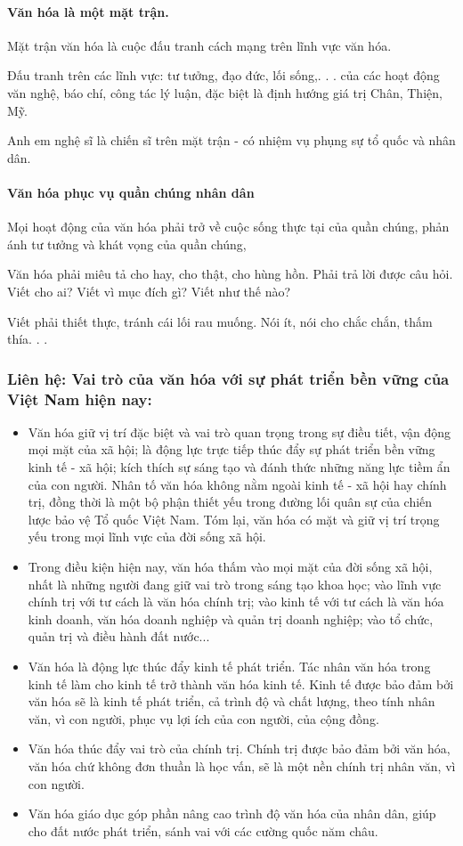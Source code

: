 \paragraph{Văn hóa là một mặt trận.}
Mặt trận văn hóa là cuộc đấu tranh cách mạng trên lĩnh vực văn hóa.

Đấu tranh trên các lĩnh vực: tư tưởng, đạo đức, lối sống,. . . của các hoạt động văn nghệ, báo chí, công tác lý luận, đặc biệt là định hướng giá trị Chân, Thiện, Mỹ.

Anh em nghệ sĩ là chiến sĩ trên mặt trận - có nhiệm vụ phụng sự tổ quốc và nhân dân.

\paragraph{Văn hóa phục vụ quần chúng nhân dân}
Mọi hoạt động của văn hóa phải trở về cuộc sống thực tại của quần chúng, phản ánh tư tưởng và khát vọng của quần chúng,

Văn hóa phải miêu tả cho hay, cho thật, cho hùng hồn. Phải trả lời được câu hỏi. Viết cho ai? Viết vì mục đích gì? Viết như thế nào?

Viết phải thiết thực, tránh cái lối rau muống. Nói ít, nói cho chắc chắn, thấm thía. . .

\subsubsection{Liên hệ: Vai trò của văn hóa với sự phát triển bền vững của Việt Nam hiện nay:}
\begin{itemize}
    \item Văn hóa giữ vị trí đặc biệt và vai trò quan trọng trong sự điều tiết, vận động mọi mặt của xã hội; là động lực trực tiếp thúc đẩy sự phát triển bền vững kinh tế - xã hội; kích thích sự sáng tạo và đánh thức những năng lực tiềm ẩn của con người. Nhân tố văn hóa không nằm ngoài kinh tế - xã hội hay chính trị, đồng thời là một bộ phận thiết yếu trong đường lối quân sự của chiến lược bảo vệ Tổ quốc Việt Nam. Tóm lại, văn hóa có mặt và giữ vị trí trọng yếu trong mọi lĩnh vực của đời sống xã hội.
    \item Trong điều kiện hiện nay, văn hóa thấm vào mọi mặt của đời sống xã hội, nhất là những người đang giữ vai trò trong sáng tạo khoa học; vào lĩnh vực chính trị với tư cách là văn hóa chính trị; vào kinh tế với tư cách là văn hóa kinh doanh, văn hóa doanh nghiệp và quản trị doanh nghiệp; vào tổ chức, quản trị và điều hành đất nước...
    \item Văn hóa là động lực thúc đẩy kinh tế phát triển. Tác nhân văn hóa trong kinh tế làm cho kinh tế trở thành văn hóa kinh tế. Kinh tế được bảo đảm bởi văn hóa sẽ là kinh tế phát triển, cả trình độ và chất lượng, theo tính nhân văn, vì con người, phục vụ lợi ích của con người, của cộng đồng.
    \item Văn hóa thúc đẩy vai trò của chính trị. Chính trị được bảo đảm bởi văn hóa, văn hóa chứ không đơn thuần là học vấn, sẽ là một nền chính trị nhân văn, vì con người.
    \item Văn hóa giáo dục góp phần nâng cao trình độ văn hóa của nhân dân, giúp cho đất nước phát triển, sánh vai với các cường quốc năm châu.
\end{itemize}
